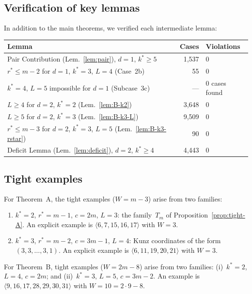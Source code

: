 \documentclass[11pt]{amsart}
\theoremstyle{definition}
\theoremstyle{remark}
\begin{document}
\subsection{Verification of key lemmas}

In addition to the main theorems, we verified each intermediate lemma:

\begin{center}
\begin{tabular}{lrl}
\toprule
\textbf{Lemma} & \textbf{Cases} & \textbf{Violations} \\
\midrule
Pair Contribution (Lem.~\ref{lem:pair}), $d=1$, $k^*\ge 5$ & 1{,}537 & 0 \\
$r^* \le m-2$ for $d=1$, $k^*=3$, $L=4$ (Case~2b) & 55 & 0 \\
$k^*=4$, $L=5$ impossible for $d=1$ (Subcase~3c) & --- & 0 cases found \\
$L \ge 4$ for $d=2$, $k^*=2$ (Lem.~\ref{lem:B-k2}) & 3{,}648 & 0 \\
$L \ge 5$ for $d=2$, $k^*=3$ (Lem.~\ref{lem:B-k3-L}) & 9{,}509 & 0 \\
$r^* \le m-3$ for $d=2$, $k^*=3$, $L=5$ (Lem.~\ref{lem:B-k3-rstar}) & 90 & 0 \\
Deficit Lemma (Lem.~\ref{lem:deficit}), $d=2$, $k^*\ge 4$ & 4{,}443 & 0 \\
\bottomrule
\end{tabular}
\end{center}

\subsection{Tight examples}

For Theorem~A, the tight examples ($W = m - 3$) arise from two families:
\begin{enumerate}[nosep]
  \item $k^* = 2$, $r^* = m - 1$, $c = 2m$, $L = 3$: the family~$T_m$ of
    Proposition~\ref{prop:tight-A}.  An explicit example is
    $\langle 6, 7, 15, 16, 17 \rangle$ with $W = 3$.
  \item $k^* = 3$, $r^* = m - 2$, $c = 3m - 1$, $L = 4$: Kunz coordinates
    of the form $(3, 3, \ldots, 3, 1)$.  An explicit example is
    $\langle 6, 11, 19, 20, 21 \rangle$ with $W = 3$.
\end{enumerate}

For Theorem~B, tight examples ($W = 2m - 8$) arise from two families:
(i)~$k^* = 2$, $L = 4$, $c = 2m$; and (ii)~$k^* = 3$, $L = 5$, $c = 3m - 2$.
An example is $\langle 9, 16, 17, 28, 29, 30, 31 \rangle$ with $W = 10 = 2 \cdot 9 - 8$.
\end{document}
